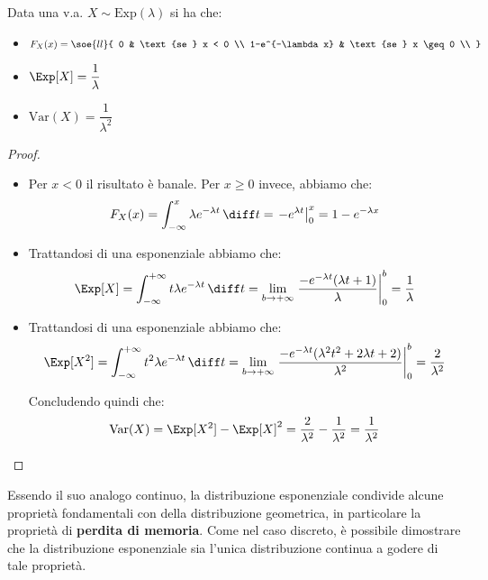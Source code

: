 \documentclass[a4paper, 12pt]{report}
\begin{document}
    \begin{framedprop}{}
        Data una v.a. $X \sim \mathrm{Exp}(\lambda)$ si ha che:
        \begin{itemize}
            \item $\displaystyle F_X(x) = \soe{ll}{
                0 & \text{se } x < 0 \\
                1-e^{-\lambda x} & \text{se } x \geq 0 \\
            }$
            \item $\Exp[X] = \dfrac{1}{\lambda}$
            \item $\mathrm{Var}(X) = \dfrac{1}{\lambda^2}$
        \end{itemize}
    \end{framedprop}

    \begin{proof} \,
        
        \begin{itemize}
            \item Per $x < 0$ il risultato è banale. Per $x \geq 0$ invece, abbiamo che:
            \[F_X(x) = \int_{-\infty}^x \lambda e^{-\lambda t} \, \diff t = \left . -e^{\lambda t} \right |_{0}^{x} = 1-e^{-\lambda x}\]

            \item Trattandosi di una esponenziale abbiamo che:
            \[\Exp[X] = \int_{-\infty}^{+\infty} t \lambda e^{-\lambda t} \, \diff t = \lim_{b \to +\infty}\left . \frac{-e^{-\lambda t}(\lambda t + 1)}{\lambda}\right |_{0}^{b} = \frac{1}{\lambda}\]

            \item Trattandosi di una esponenziale abbiamo che:
            \[\Exp[X^2] = \int_{-\infty}^{+\infty} t^2 \lambda e^{-\lambda t} \, \diff t = \lim_{b \to +\infty} \left . \frac{-e^{-\lambda t}(\lambda^2 t^2 + 2 \lambda t + 2)}{\lambda^2}\right |_{0}^{b} = \frac{2}{\lambda^2}\]

            Concludendo quindi che:
            \[\mathrm{Var}(X) = \Exp[X^2] - \Exp[X]^2 = \frac{2}{\lambda^2} - \frac{1}{\lambda^2} = \frac{1}{\lambda^2}\]
        \end{itemize}
    \end{proof}

    Essendo il suo analogo continuo, la distribuzione esponenziale condivide alcune proprietà fondamentali con della distribuzione geometrica, in particolare la proprietà di \textbf{perdita di memoria}. Come nel caso discreto, è possibile dimostrare che la distribuzione esponenziale sia l'unica distribuzione continua a godere di tale proprietà.
    
\end{document}
